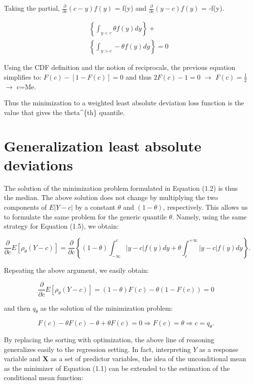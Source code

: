 \documentclass[
  letterpaper,
  DIV=11,
  numbers=noendperiod]{scrreprt}
\begin{document}
Taking the partial, \(\frac{\partial}{\partial c}(c-y)f(y)\) = f(y) and
\(\frac{\partial}{\partial c}(y-c)f(y)\) = -f(y).

\[
\begin{aligned}
& \left\{\int_{y<c} \theta f(y) d y\right\}+ \\
& \left\{\int_{y>c} -\theta f(y) d y\right\}=0
\end{aligned}
\]

Using the CDF definition and the notion of reciprocals, the previous
equation simplifies to: \(F(c)-[1-F(c)] = 0\) and thus \(2F(c)-1=0\)
\(\longrightarrow\) \(F(c)=\frac{1}{2}\) \(\longrightarrow\) c=Me.

Thus the minimization to a weighted least absolute deviation loss
function is the value that gives the theta\^{}\{th\} quantile.

\hypertarget{generalization-least-absolute-deviations}{%
\chapter{Generalization least absolute
deviations}\label{generalization-least-absolute-deviations}}

The solution of the minimization problem formulated in Equation (1.2) is
thus the median. The above solution does not change by multiplying the
two components of \(E|Y-c|\) by a constant \(\theta\) and
\((1-\theta)\), respectively. This allows us to formulate the same
problem for the generic quantile \(\theta\). Namely, using the same
strategy for Equation (1.5), we obtain:

\[
\frac{\partial}{\partial c} E\left[\rho_\theta(Y-c)\right]=\frac{\partial}{\partial c}\left\{(1-\theta) \int_{-\infty}^c|y-c| f(y) d y+\theta \int_c^{+\infty}|y-c| f(y) d y\right\} .
\]

Repeating the above argument, we easily obtain:

\[
\frac{\partial}{\partial c} E\left[\rho_\theta(Y-c)\right]=(1-\theta) F(c)-\theta(1-F(c))=0
\]

and then \(q_\theta\) as the solution of the minimization problem:

\[
F(c)-\theta F(c)-\theta+\theta F(c)=0 \Longrightarrow F(c)=\theta \Longrightarrow c=q_\theta .
\]

By replacing the sorting with optimization, the above line of reasoning
generalizes easily to the regression setting. In fact, interpreting
\(Y\) as a response variable and \(\mathbf{X}\) as a set of predictor
variables, the idea of the unconditional mean as the minimizer of
Equation (1.1) can be extended to the estimation of the conditional mean
function:
\end{document}
